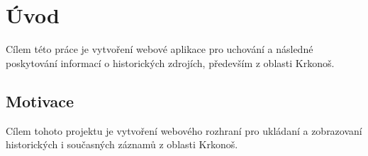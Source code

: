 \chapter{Úvod}
Cílem této práce je vytvoření webové aplikace pro uchování a
následné poskytování informací o historických zdrojích, především z oblasti Krkonoš.


\section{Motivace}
Cílem tohoto projektu je vytvoření webového rozhraní
pro ukládaní a zobrazovaní historických i současných záznamů z
oblasti Krkonoš.

